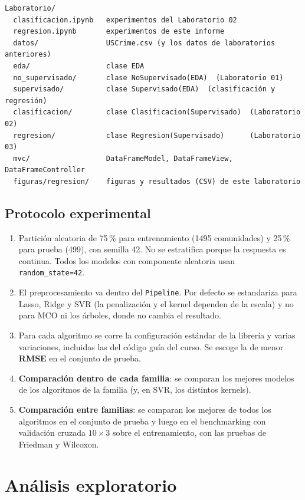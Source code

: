 \documentclass[11pt,a4paper]{article}
\begin{document}
\begin{verbatim}
Laboratorio/
  clasificacion.ipynb   experimentos del Laboratorio 02
  regresion.ipynb       experimentos de este informe
  datos/                USCrime.csv (y los datos de laboratorios anteriores)
  eda/                  clase EDA
  no_supervisado/       clase NoSupervisado(EDA)  (Laboratorio 01)
  supervisado/          clase Supervisado(EDA)  (clasificación y regresión)
  clasificacion/        clase Clasificacion(Supervisado)  (Laboratorio 02)
  regresion/            clase Regresion(Supervisado)      (Laboratorio 03)
  mvc/                  DataFrameModel, DataFrameView, DataFrameController
  figuras/regresion/    figuras y resultados (CSV) de este laboratorio
\end{verbatim}

\subsection{Protocolo experimental}
\begin{enumerate}
  \item Partición aleatoria de 75\,\% para entrenamiento (1495 comunidades) y 25\,\% para prueba (499), con semilla 42. No se estratifica porque la respuesta es continua. Todos los modelos con componente aleatoria usan \texttt{random\_state=42}.
  \item El preprocesamiento va dentro del \texttt{Pipeline}. Por defecto se estandariza para Lasso, Ridge y SVR (la penalización y el kernel dependen de la escala) y no para MCO ni los árboles, donde no cambia el resultado.
  \item Para cada algoritmo se corre la configuración estándar de la librería y varias variaciones, incluidas las del código guía del curso. Se escoge la de menor \textbf{RMSE} en el conjunto de prueba.
  \item \textbf{Comparación dentro de cada familia}: se comparan los mejores modelos de los algoritmos de la familia (y, en SVR, los distintos kernels).
  \item \textbf{Comparación entre familias}: se comparan los mejores de todos los algoritmos en el conjunto de prueba y luego en el benchmarking con validación cruzada $10\times3$ sobre el entrenamiento, con las pruebas de Friedman y Wilcoxon.
\end{enumerate}

\section{Análisis exploratorio}
\end{document}
